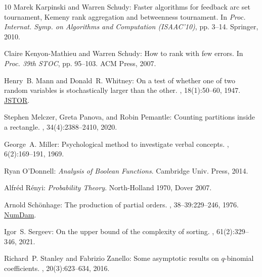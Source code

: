 \documentclass[11pt]{article}
\numberwithin{equation}{section}
\theoremstyle{definition}
\theoremstyle{plain}
\begin{document}
\begin{thebibliography}{10}
{\sc Marek Karpinski and Warren Schudy}: Faster algorithms for feedback arc set
  tournament, {K}emeny rank aggregation and betweenness tournament.
\newblock In {\em Proc. Internat. Symp. on Algorithms and Computation
  (ISAAC'10)}, pp. 3--14. Springer, 2010.
\newblock [\epfmtdoi{10.1007/978-3-642-17517-6\_3}]

{\sc Claire Kenyon-Mathieu and Warren Schudy}: How to rank with few errors.
\newblock In {\em Proc. 39th STOC}, pp. 95--103. ACM Press, 2007.
\newblock [\epfmtdoi{10.1145/1250790.1250806}]

{\sc Henry~B. Mann and Donald~R. Whitney}: On a test of whether one of two
  random variables is stochastically larger than the other.
, 18(1):50--60, 1947.
\newblock \href{https://www.jstor.org/stable/2236101}{JSTOR}.

{\sc Stephen Melczer, Greta Panova, and Robin Pemantle}: Counting partitions
  inside a rectangle.
, 34(4):2388--2410, 2020.
\newblock [\epfmtdoi{10.1137/20M1315828}]

{\sc George~A. Miller}: Psychological method to investigate verbal concepts.
, 6(2):169--191, 1969.
\newblock [\epfmtdoi{10.1016/0022-2496(69)90001-7}]

{\sc Ryan O'Donnell}: {\em Analysis of Boolean Functions}.
\newblock Cambridge Univ. Press, 2014.

{\sc Alfr\'ed R\'enyi}: {\em Probability Theory}.
\newblock North-Holland 1970, Dover 2007.

{\sc Arnold Sch\"onhage}: The production of partial orders.
, 38--39:229--246, 1976.
\newblock
  \href{http://www.numdam.org/book-part/AST\_1976\_\_38-39\_\_229\_0/}{NumDam}.

{\sc Igor~S. Sergeev}: On the upper bound of the complexity of sorting.
, 61(2):329--346, 2021.
\newblock [\epfmtdoi{10.1134/S0965542521020111}]

{\sc Richard~P. Stanley and Fabrizio Zanello}: Some asymptotic results on
  $q$-binomial coefficients.
, 20(3):623--634, 2016.
\newblock [\epfmtdoi{10.1007/s00026-016-0319-8}]


\end{thebibliography}
\end{document}
